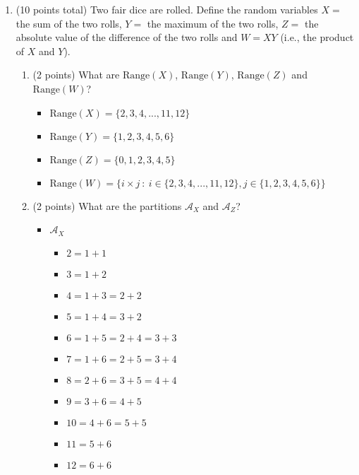 \documentclass[11pt]{article}
\newcommand{\Range}{{\mathrm{Range}}}
\newcommand{\A}{{\mathcal{A}}}
\begin{document}
\begin{enumerate}
\begin{itemize}
	\end{itemize}
	
	\item (10 points total) Two fair dice are rolled.  Define the random variables
		  $X =$ the sum of the two rolls,
		  $Y =$ the maximum of the two rolls,
		  $Z =$ the absolute value of the difference of the two rolls
		  and $W = XY$ (i.e., the product of $X$ and $Y$).
	\begin{enumerate}
	 \item (2 points) What are $\Range(X)$, $\Range(Y)$, $\Range(Z)$ and
	 $\Range(W)$?
	 
	 \begin{itemize}
	 
		 \item $\Range(X) = \lbrace 2, 3, 4, ... , 11, 12 \rbrace $
		 \item $\Range(Y) = \lbrace 1, 2, 3, 4, 5, 6 \rbrace $
		 \item $\Range(Z) = \lbrace 0, 1, 2, 3, 4, 5 \rbrace$
		 \item $\Range(W) = \lbrace i \times j \: : \: i \in \lbrace 2, 3, 4, ... , 11, 12 \rbrace, j \in \lbrace 1, 2, 3, 4, 5, 6 \rbrace\rbrace $
	 
	 \end{itemize}
	
	 \item (2 points) What are the partitions $\A_X$ and $\A_Z$?
	 
	 \begin{itemize}
	 
	 	\item $\A_X$
		
			\begin{itemize}
			
				\item $2 = 1 + 1$
				\item $3 = 1 + 2$
				\item $4 = 1 + 3 = 2 + 2$
				\item $5 = 1 + 4 = 3 + 2$
				\item $6 = 1 + 5 = 2 + 4 = 3 + 3$
				\item $7 = 1 + 6 = 2 + 5 = 3 + 4$
				\item $8 = 2 + 6 = 3 + 5 = 4 + 4$
				\item $9 = 3 + 6 = 4 + 5$
				\item $10 = 4 + 6 = 5 + 5$
				\item $11 = 5 + 6$
				\item $12 = 6 + 6$
			

\end{itemize}
\end{itemize}
\end{enumerate}
\end{enumerate}
\end{document}
